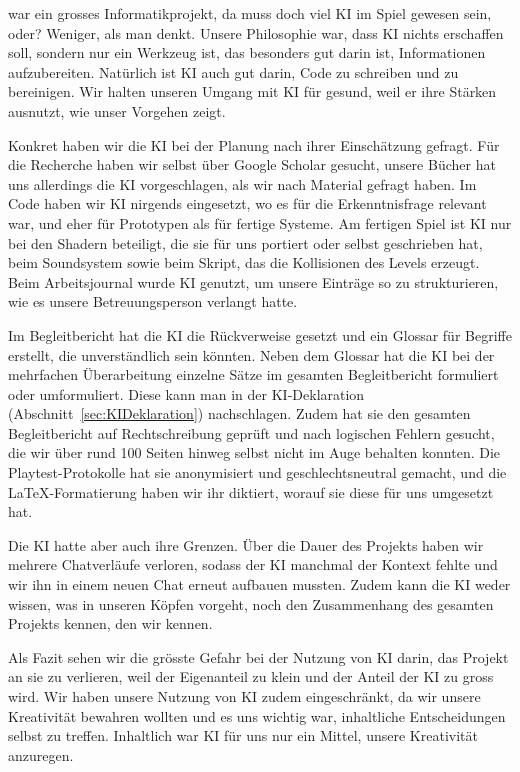 \documentclass[../Main.tex]{subfiles}
\begin{document}
 war ein grosses Informatikprojekt, da muss doch viel KI im Spiel gewesen sein, oder? Weniger, als man denkt. Unsere Philosophie war, dass KI nichts erschaffen soll, sondern nur ein Werkzeug ist, das besonders gut darin ist, Informationen aufzubereiten. Natürlich ist KI auch gut darin, Code zu schreiben und zu bereinigen. Wir halten unseren Umgang mit KI für gesund, weil er ihre Stärken ausnutzt, wie unser Vorgehen zeigt.

Konkret haben wir die KI bei der Planung nach ihrer Einschätzung gefragt. Für die Recherche haben wir selbst über Google Scholar gesucht, unsere Bücher hat uns allerdings die KI vorgeschlagen, als wir nach Material gefragt haben. Im Code haben wir KI nirgends eingesetzt, wo es für die Erkenntnisfrage relevant war, und eher für Prototypen als für fertige Systeme. Am fertigen Spiel ist KI nur bei den Shadern beteiligt, die sie für uns portiert oder selbst geschrieben hat, beim Soundsystem sowie beim Skript, das die Kollisionen des Levels erzeugt. Beim Arbeitsjournal wurde KI genutzt, um unsere Einträge so zu strukturieren, wie es unsere Betreuungsperson verlangt hatte.

Im Begleitbericht hat die KI die Rückverweise gesetzt und ein Glossar für Begriffe erstellt, die unverständlich sein könnten. Neben dem Glossar hat die KI bei der mehrfachen Überarbeitung einzelne Sätze im gesamten Begleitbericht formuliert oder umformuliert. Diese kann man in der KI-Deklaration (Abschnitt~\ref{sec:KIDeklaration}) nachschlagen. Zudem hat sie den gesamten Begleitbericht auf Rechtschreibung geprüft und nach logischen Fehlern gesucht, die wir über rund 100 Seiten hinweg selbst nicht im Auge behalten konnten. Die Playtest-Protokolle hat sie anonymisiert und geschlechtsneutral gemacht, und die \LaTeX-Formatierung haben wir ihr diktiert, worauf sie diese für uns umgesetzt hat.

Die KI hatte aber auch ihre Grenzen. Über die Dauer des Projekts haben wir mehrere Chatverläufe verloren, sodass der KI manchmal der Kontext fehlte und wir ihn in einem neuen Chat erneut aufbauen mussten. Zudem kann die KI weder wissen, was in unseren Köpfen vorgeht, noch den Zusammenhang des gesamten Projekts kennen, den wir kennen.

Als Fazit sehen wir die grösste Gefahr bei der Nutzung von KI darin, das Projekt an sie zu verlieren, weil der Eigenanteil zu klein und der Anteil der KI zu gross wird. Wir haben unsere Nutzung von KI zudem eingeschränkt, da wir unsere Kreativität bewahren wollten und es uns wichtig war, inhaltliche Entscheidungen selbst zu treffen. Inhaltlich war KI für uns nur ein Mittel, unsere Kreativität anzuregen.
\end{document}
